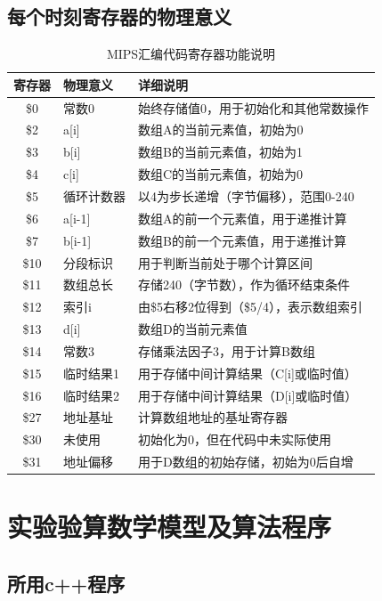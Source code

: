 \documentclass[12pt,a4paper]{article}
\begin{document}
\subsection{每个时刻寄存器的物理意义}
\begin{table}[htbp]
\centering
\caption{MIPS汇编代码寄存器功能说明}
\label{tab:register_functions}
\begin{tabular}{|c|l|l|}
\hline
\textbf{寄存器} & \textbf{物理意义} & \textbf{详细说明} \\ \hline
\$0  & 常数0 & 始终存储值0，用于初始化和其他常数操作 \\ \hline
\$2  & a[i] & 数组A的当前元素值，初始为0 \\ \hline
\$3  & b[i] & 数组B的当前元素值，初始为1 \\ \hline
\$4  & c[i] & 数组C的当前元素值，初始为0 \\ \hline
\$5  & 循环计数器 & 以4为步长递增（字节偏移），范围0-240 \\ \hline
\$6  & a[i-1] & 数组A的前一个元素值，用于递推计算 \\ \hline
\$7  & b[i-1] & 数组B的前一个元素值，用于递推计算 \\ \hline
\$10 & 分段标识 & 用于判断当前处于哪个计算区间 \\ \hline
\$11 & 数组总长 & 存储240（字节数），作为循环结束条件 \\ \hline
\$12 & 索引i & 由\$5右移2位得到（\$5/4），表示数组索引 \\ \hline
\$13 & d[i] & 数组D的当前元素值 \\ \hline
\$14 & 常数3 & 存储乘法因子3，用于计算B数组 \\ \hline
\$15 & 临时结果1 & 用于存储中间计算结果（C[i]或临时值） \\ \hline
\$16 & 临时结果2 & 用于存储中间计算结果（D[i]或临时值） \\ \hline
\$27 & 地址基址 & 计算数组地址的基址寄存器 \\ \hline
\$30 & 未使用 & 初始化为0，但在代码中未实际使用 \\ \hline
\$31 & 地址偏移 & 用于D数组的初始存储，初始为0后自增 \\ \hline
\end{tabular}
\end{table}
\clearpage
\section{实验验算数学模型及算法程序}
\subsection{所用c++程序}
\end{document}
